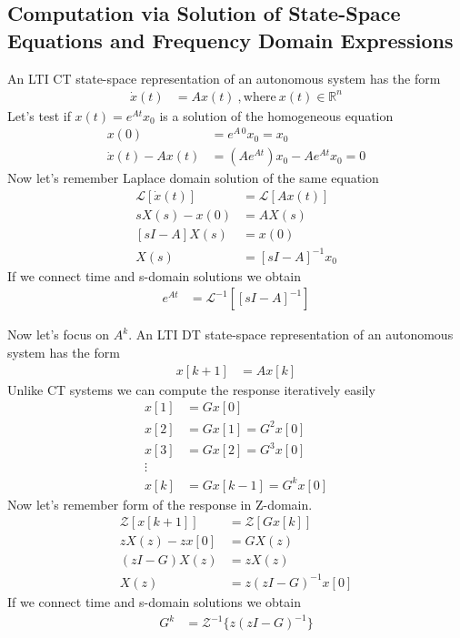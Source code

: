 \documentclass[twoside]{article}
\begin{document}
\subsection{Computation via Solution of State-Space Equations and Frequency Domain Expressions}

An LTI CT state-space representation of an autonomous system has the form
%
\begin{align*}
  \dot{x}(t) &= A x(t) \ , \mathrm{where} \ x(t) \in \mathbb{R}^n 
\end{align*}
%
Let's test if $x(t) = e^{A t} x_0$ is a solution of the homogeneous  equation
%
\begin{align*}
  x(0) &= e^{A \, 0} x_0 = x_0
  \\
  \dot{x}(t) - A x(t) &= \left( A e^{At} \right) x_0 - A e^{At} x_0 = 0
\end{align*}
%
Now let's remember Laplace domain solution of the same equation
%
\begin{align*}
\mathcal{L} \left[ \dot{x}(t) \right] &= \mathcal{L} \left[  A x(t) \right]
\\
s X(s) - x(0) &= A X(s) 
\\
[s I - A]  X(s) &= x(0) 
\\
X(s) &= [s I - A]^{-1} x_0 
\end{align*}
%
If we connect time and s-domain solutions we obtain
%
\begin{align*}
  e^{A t} &= \mathcal{L}^{-1} \left[ [s I - A]^{-1} \right]
\end{align*}

Now let's focus on $A^k$. An LTI DT state-space representation of an autonomous system has the form
%
\begin{align*}
  x[k+1] &= A x[k] 
\end{align*}
%
Unlike CT systems we can compute the response iteratively easily
%
\begin{align*}
  x[1] &= G x[0] 
  \\
  x[2] &= G x[1] = G^2 x[0] 
  \\
  x[3] &= G x[2] = G^3 x[0] 
  \\
  \vdots
  \\
  x[k] &= G x[k-1] = G^k x[0] 
\end{align*}
%
Now let's remember form of the response in Z-domain.
%
\begin{align*}
\mathcal{Z} \left[ x[k+1] \right] &= \mathcal{Z} \left[ G x[k] \right]
\\
z X(z) - z x[0] &= G X(z)
\\
\left( z I - G \right) X(z) &= z X(z) 
\\
X(z) &= z \left( z I - G \right)^{-1} x[0]
\end{align*}
%
If we connect time and s-domain solutions we obtain
\begin{align*}
G^k &= \mathcal{Z}^{-1} \lbrace z \left( z I - G \right)^{-1} \rbrace
\end{align*}
\end{document}
